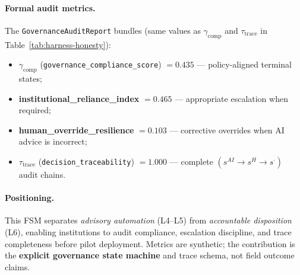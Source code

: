 \paragraph{Formal audit metrics.}
The \texttt{GovernanceAuditReport} bundles (same values as
$\gamma_{\mathrm{comp}}$ and $\tau_{\mathrm{trace}}$ in
Table~\ref{tab:harness-honesty}):
\begin{itemize}[noitemsep]
  \item $\gamma_{\mathrm{comp}}$ (\texttt{governance\_compliance\_score}) $=0.435$
        --- policy-aligned terminal states;
  \item \textbf{institutional\_reliance\_index} $=0.465$
        --- appropriate escalation when required;
  \item \textbf{human\_override\_resilience} $=0.103$
        --- corrective overrides when AI advice is incorrect;
  \item $\tau_{\mathrm{trace}}$ (\texttt{decision\_traceability}) $=1.000$
        --- complete $(s^{AI} \rightarrow s^{H} \rightarrow s^{\cdot})$ audit chains.
\end{itemize}

\paragraph{Positioning.}
This FSM separates \emph{advisory automation} (L4--L5) from \emph{accountable disposition}
(L6), enabling institutions to audit compliance, escalation discipline, and trace completeness
before pilot deployment. Metrics are synthetic; the contribution is the \textbf{explicit
governance state machine} and trace schema, not field outcome claims.
